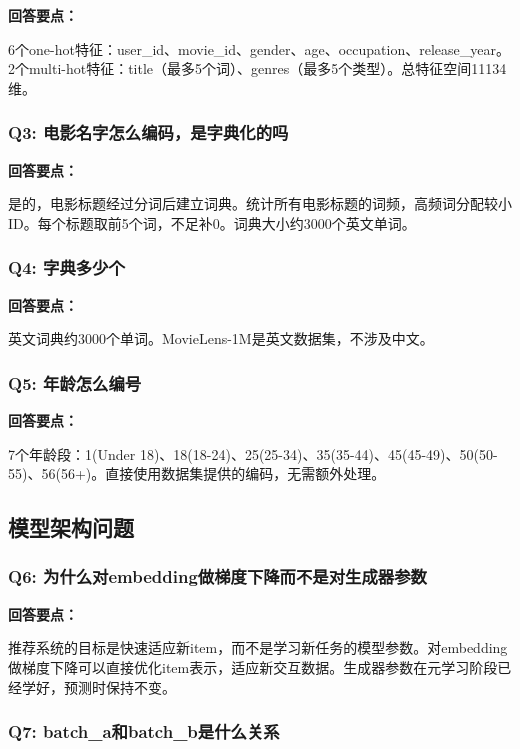 \documentclass[12pt,a4paper]{article}
\begin{document}
\textbf{回答要点：}

6个one-hot特征：user\_id、movie\_id、gender、age、occupation、release\_year。2个multi-hot特征：title（最多5个词）、genres（最多5个类型）。总特征空间11134维。

\subsubsection{Q3: 电影名字怎么编码，是字典化的吗}

\textbf{回答要点：}

是的，电影标题经过分词后建立词典。统计所有电影标题的词频，高频词分配较小ID。每个标题取前5个词，不足补0。词典大小约3000个英文单词。

\subsubsection{Q4: 字典多少个}

\textbf{回答要点：}

英文词典约3000个单词。MovieLens-1M是英文数据集，不涉及中文。

\subsubsection{Q5: 年龄怎么编号}

\textbf{回答要点：}

7个年龄段：1(Under 18)、18(18-24)、25(25-34)、35(35-44)、45(45-49)、50(50-55)、56(56+)。直接使用数据集提供的编码，无需额外处理。

\subsection{模型架构问题}

\subsubsection{Q6: 为什么对embedding做梯度下降而不是对生成器参数}

\textbf{回答要点：}

推荐系统的目标是快速适应新item，而不是学习新任务的模型参数。对embedding做梯度下降可以直接优化item表示，适应新交互数据。生成器参数在元学习阶段已经学好，预测时保持不变。

\subsubsection{Q7: batch\_a和batch\_b是什么关系}
\end{document}
